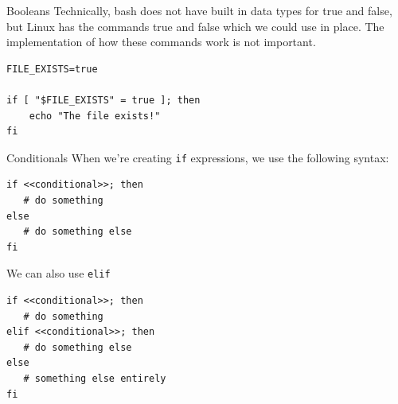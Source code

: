 \documentclass[10pt]{beamer}
\begin{document}
\begin{frame}[label={sec:org390bd85},fragile]{Booleans}
 Technically, bash does not have built in data types for true and false, but
Linux has the commands true and false which we could use in place. The
implementation of how these commands work is not important.

\begin{verbatim}
FILE_EXISTS=true

if [ "$FILE_EXISTS" = true ]; then
    echo "The file exists!"
fi
\end{verbatim}
\end{frame}


\begin{frame}[label={sec:org02d5052},fragile]{Conditionals}
 When we're creating \texttt{if} expressions, we use the following syntax:

\begin{verbatim}
if <<conditional>>; then
   # do something
else
   # do something else
fi
\end{verbatim}

We can also use \texttt{elif}

\begin{verbatim}
if <<conditional>>; then
   # do something
elif <<conditional>>; then
   # do something else
else
   # something else entirely
fi
\end{verbatim}
\end{frame}
\end{document}
